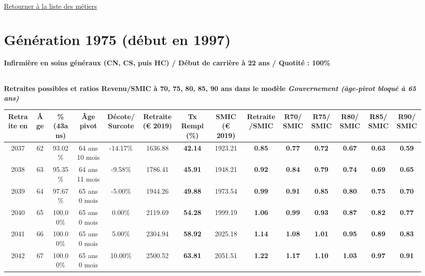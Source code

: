  \hyperlink{page.2}{\noindent Retourner à la liste des métiers}

 \newpage 

\section{Génération 1975 (début en 1997)\label{Infirmier_100_22_1975_0}} 
 
{\bf \noindent Infirmière en soins généraux (CN, CS, puis HC) / Début de carrière à 22 ans / Quotité : 100\%}  ~ 

 ~\\{\bf \noindent Retraites possibles et ratios Revenu/SMIC à 70, 75, 80, 85, 90 ans dans le modèle \emph{Gouvernement (âge-pivot bloqué à 65 ans)}}  
 
\begin{adjustbox}{max width=\textwidth} 
\begin{tabular}[htb]{|c|c||c|c|c||c|c||c|c||c|c|c|c|c|} 
\hline 
 Retraite en &  Âge &  \%(43ans) &  Âge pivot &  Décote/Surcote &  Retraite (\euro{} 2019) &  Tx Rempl(\%) &  SMIC (\euro{} 2019) &  Retraite/SMIC &  R70/SMIC &  R75/SMIC &  R80/SMIC &  R85/SMIC &  R90/SMIC \\ 
\hline \hline 
 2037 &  62 &  93.02\% &  64 ans 10 mois &  -14.17\% &  1636.88 &  {\bf 42.14} &  1923.21 &  {\bf {\color{red} 0.85}} &  {\bf {\color{red} 0.77}} &  {\bf {\color{red} 0.72}} &  {\bf {\color{red} 0.67}} &  {\bf {\color{red} 0.63}} &  {\bf {\color{red} 0.59}} \\ 
\hline 
 2038 &  63 &  95.35\% &  64 ans 11 mois &  -9.58\% &  1786.41 &  {\bf 45.91} &  1948.21 &  {\bf {\color{red} 0.92}} &  {\bf {\color{red} 0.84}} &  {\bf {\color{red} 0.79}} &  {\bf {\color{red} 0.74}} &  {\bf {\color{red} 0.69}} &  {\bf {\color{red} 0.65}} \\ 
\hline 
 2039 &  64 &  97.67\% &  65 ans 0 mois &  -5.00\% &  1944.26 &  {\bf 49.88} &  1973.54 &  {\bf {\color{red} 0.99}} &  {\bf {\color{red} 0.91}} &  {\bf {\color{red} 0.85}} &  {\bf {\color{red} 0.80}} &  {\bf {\color{red} 0.75}} &  {\bf {\color{red} 0.70}} \\ 
\hline 
 2040 &  65 &  100.00\% &  65 ans 0 mois &  0.00\% &  2119.69 &  {\bf 54.28} &  1999.19 &  {\bf 1.06} &  {\bf {\color{red} 0.99}} &  {\bf {\color{red} 0.93}} &  {\bf {\color{red} 0.87}} &  {\bf {\color{red} 0.82}} &  {\bf {\color{red} 0.77}} \\ 
\hline 
 2041 &  66 &  100.00\% &  65 ans 0 mois &  5.00\% &  2304.94 &  {\bf 58.92} &  2025.18 &  {\bf 1.14} &  {\bf 1.08} &  {\bf 1.01} &  {\bf {\color{red} 0.95}} &  {\bf {\color{red} 0.89}} &  {\bf {\color{red} 0.83}} \\ 
\hline 
 2042 &  67 &  100.00\% &  65 ans 0 mois &  10.00\% &  2500.52 &  {\bf 63.81} &  2051.51 &  {\bf 1.22} &  {\bf 1.17} &  {\bf 1.10} &  {\bf 1.03} &  {\bf {\color{red} 0.97}} &  {\bf {\color{red} 0.91}} \\ 
\hline 
\hline 
\end{tabular} 
\end{adjustbox} 
 
